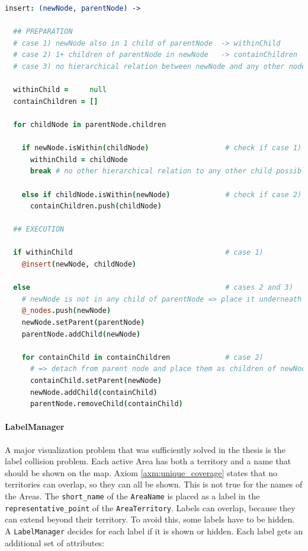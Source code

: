 \begin{center}
\begin{minipage}[t]{0.9\textwidth}
\begin{lstlisting}[language=coffeescript,
  caption=Insertion of a polygon node into the WithinTree,
  label=lst:within_tree_insertion]
insert: (newNode, parentNode) ->

  ## PREPARATION
  # case 1) newNode also in 1 child of parentNode  -> withinChild
  # case 2) 1+ children of parentNode in newNode   -> containChildren
  # case 3) no hierarchical relation between newNode and any other node

  withinChild =     null
  containChildren = []

  for childNode in parentNode.children

    if newNode.isWithin(childNode)                  # check if case 1)
      withinChild = childNode
      break # no other hierarchical relation to any other child possible

    else if childNode.isWithin(newNode)             # check if case 2)
      containChildren.push(childNode)

  ## EXECUTION

  if withinChild                                    # case 1)
    @insert(newNode, childNode)

  else                                              # cases 2 and 3)
    # newNode is not in any child of parentNode => place it underneath
    @_nodes.push(newNode)
    newNode.setParent(parentNode)
    parentNode.addChild(newNode)

    for containChild in containChildren             # case 2)
      # => detach from parent node and place them as children of newNode
      containChild.setParent(newNode)
      newNode.addChild(containChild)
      parentNode.removeChild(containChild)
\end{lstlisting}
\end{minipage}
\end{center}


\paragraph{LabelManager} %
\label{par:labelmanager}

A major visualization problem that was sufficiently solved in the thesis is the label collision problem. Each active Area has both a territory and a name that should be shown on the map. Axiom \ref{axm:unique_coverage} states that no territories can overlap, so they can all be shown. This is not true for the names of the Areas. The \texttt{short\_name} of the \texttt{AreaName} is placed as a label in the \texttt{representative\_point} of the \texttt{AreaTerritory}. Labels can overlap, because they can extend beyond their territory. To avoid this, some labels have to be hidden. A \texttt{LabelManager} decides for each label if it is shown or hidden. Each label gets an additional set of attributes:

